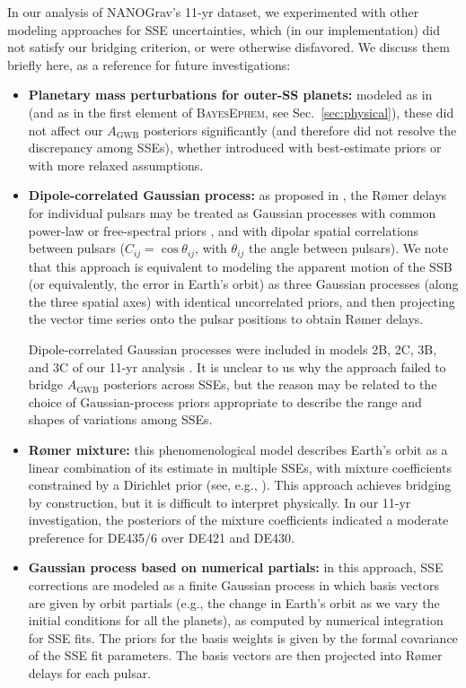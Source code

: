 \documentclass[iop,apj,twocolappendix]{emulateapj}
\begin{document}
In our analysis of NANOGrav's 11-yr dataset, we experimented with other modeling approaches for SSE uncertainties, which (in our implementation) did not satisfy our bridging criterion, or were otherwise disfavored. We discuss them briefly here, as a reference for future investigations:
%
\begin{itemize} %
    \item \textbf{Planetary mass perturbations for outer-SS planets:} modeled as in \cite{2010ApJ...720L.201C} (and as in the first element of \textsc{BayesEphem}, see Sec.\ \ref{sec:physical}), these did not affect our $A_\mathrm{GWB}$ posteriors significantly (and therefore did not resolve the discrepancy among SSEs), whether introduced with best-estimate priors \citep{iaumasses} or with more relaxed assumptions.
    \item \textbf{Dipole-correlated Gaussian process:}
    as proposed in \cite{2016MNRAS.455.4339T}, the R{\o}mer delays for individual pulsars may be treated as Gaussian processes with common power-law or free-spectral priors \citep{vhv14}, and with dipolar spatial correlations between pulsars ($C_{ij} = \cos \theta_{ij}$, with $\theta_{ij}$ the angle between pulsars).
    We note that this approach is equivalent to modeling the apparent motion of the SSB (or equivalently, the error in Earth's orbit) as three Gaussian processes (along the three spatial axes) with identical uncorrelated priors, and then projecting the vector time series onto the pulsar positions to obtain R{\o}mer delays.
    
    Dipole-correlated Gaussian processes were included in models 2B, 2C, 3B, and 3C of our 11-yr analysis \citep{2018ApJ...859...47A}.
    It is unclear to us why the approach failed to bridge $A_\mathrm{GWB}$ posteriors across SSEs, but the reason may be related to the choice of Gaussian-process priors appropriate to describe the range and shapes of variations among SSEs.
    \item \textbf{R{\o}mer mixture:} this phenomenological model describes Earth's orbit as a linear combination of its estimate in multiple SSEs, with mixture coefficients constrained by a Dirichlet prior (see, e.g., \citealt{gelman2013bayesian}). 
    This approach achieves bridging by construction, but it is difficult to interpret physically.
    In our 11-yr investigation, the posteriors of the mixture coefficients indicated a moderate preference for DE435/6 over DE421 and DE430.
    \item \textbf{Gaussian process based on numerical partials:} in this approach, SSE corrections are modeled as a finite Gaussian process \citep{williams2006gaussian} in which basis vectors are given by orbit partials (e.g., the change in Earth's orbit as we vary the initial conditions for all the planets), as computed by numerical integration for SSE fits. The priors for the basis weights is given by the formal covariance of the SSE fit parameters. The basis vectors are then projected into R{\o}mer delays for each pulsar.
    

\end{itemize}
\end{document}
